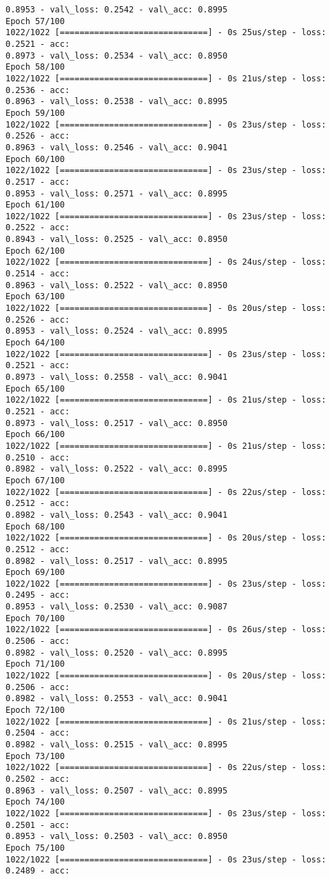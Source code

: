 \documentclass[11pt]{article}
\begin{document}
\begin{Verbatim}[commandchars=\\\{\}]
0.8953 - val\_loss: 0.2542 - val\_acc: 0.8995
Epoch 57/100
1022/1022 [==============================] - 0s 25us/step - loss: 0.2521 - acc:
0.8973 - val\_loss: 0.2534 - val\_acc: 0.8950
Epoch 58/100
1022/1022 [==============================] - 0s 21us/step - loss: 0.2536 - acc:
0.8963 - val\_loss: 0.2538 - val\_acc: 0.8995
Epoch 59/100
1022/1022 [==============================] - 0s 23us/step - loss: 0.2526 - acc:
0.8963 - val\_loss: 0.2546 - val\_acc: 0.9041
Epoch 60/100
1022/1022 [==============================] - 0s 23us/step - loss: 0.2517 - acc:
0.8953 - val\_loss: 0.2571 - val\_acc: 0.8995
Epoch 61/100
1022/1022 [==============================] - 0s 23us/step - loss: 0.2522 - acc:
0.8943 - val\_loss: 0.2525 - val\_acc: 0.8950
Epoch 62/100
1022/1022 [==============================] - 0s 24us/step - loss: 0.2514 - acc:
0.8963 - val\_loss: 0.2522 - val\_acc: 0.8950
Epoch 63/100
1022/1022 [==============================] - 0s 20us/step - loss: 0.2526 - acc:
0.8953 - val\_loss: 0.2524 - val\_acc: 0.8995
Epoch 64/100
1022/1022 [==============================] - 0s 23us/step - loss: 0.2521 - acc:
0.8973 - val\_loss: 0.2558 - val\_acc: 0.9041
Epoch 65/100
1022/1022 [==============================] - 0s 21us/step - loss: 0.2521 - acc:
0.8973 - val\_loss: 0.2517 - val\_acc: 0.8950
Epoch 66/100
1022/1022 [==============================] - 0s 21us/step - loss: 0.2510 - acc:
0.8982 - val\_loss: 0.2522 - val\_acc: 0.8995
Epoch 67/100
1022/1022 [==============================] - 0s 22us/step - loss: 0.2512 - acc:
0.8982 - val\_loss: 0.2543 - val\_acc: 0.9041
Epoch 68/100
1022/1022 [==============================] - 0s 20us/step - loss: 0.2512 - acc:
0.8982 - val\_loss: 0.2517 - val\_acc: 0.8995
Epoch 69/100
1022/1022 [==============================] - 0s 23us/step - loss: 0.2495 - acc:
0.8953 - val\_loss: 0.2530 - val\_acc: 0.9087
Epoch 70/100
1022/1022 [==============================] - 0s 26us/step - loss: 0.2506 - acc:
0.8982 - val\_loss: 0.2520 - val\_acc: 0.8995
Epoch 71/100
1022/1022 [==============================] - 0s 20us/step - loss: 0.2506 - acc:
0.8982 - val\_loss: 0.2553 - val\_acc: 0.9041
Epoch 72/100
1022/1022 [==============================] - 0s 21us/step - loss: 0.2504 - acc:
0.8982 - val\_loss: 0.2515 - val\_acc: 0.8995
Epoch 73/100
1022/1022 [==============================] - 0s 22us/step - loss: 0.2502 - acc:
0.8963 - val\_loss: 0.2507 - val\_acc: 0.8995
Epoch 74/100
1022/1022 [==============================] - 0s 23us/step - loss: 0.2501 - acc:
0.8953 - val\_loss: 0.2503 - val\_acc: 0.8950
Epoch 75/100
1022/1022 [==============================] - 0s 23us/step - loss: 0.2489 - acc:

\end{Verbatim}
\end{document}
